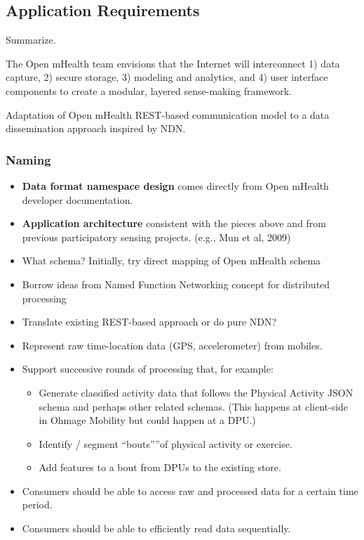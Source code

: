 \subsection{Application Requirements}

Summarize. 

The Open mHealth team envisions that the Internet will interconnect 1)
data capture, 2) secure storage, 3) modeling and analytics, and 4) user
interface components to create a modular, layered sense-making framework.  

Adaptation of Open mHealth REST-based communication model to a data dissemination approach inspired by NDN.

\subsubsection{Naming} 
\begin{itemize}
\item \textbf{Data format namespace design} comes directly from Open mHealth developer documentation. 
\item \textbf{Application architecture} consistent with the pieces above and from previous participatory sensing projects. (e.g., Mun et al, 2009)
\item What schema? Initially, try direct mapping of Open mHealth schema
\item Borrow ideas from Named Function Networking concept for distributed processing
\item Translate existing REST-based approach or do pure NDN? 
\item Represent raw time-location data (GPS, accelerometer) from mobiles. 
\item Support successive rounds of processing that, for example:  
    \begin{itemize}
    \item Generate classified activity data that follows the Physical Activity JSON schema and perhaps other related schemas.  (This happens at client-side in Ohmage Mobility but could happen at a DPU.)	
    \item Identify / segment ``bouts”''of physical activity or exercise. 
    \item Add features to a bout from DPUs to the existing store. 
    \end{itemize}
\item Consumers should be able to access raw and processed data for a certain time period.
\item Consumers should be able to efficiently read data sequentially. 
\end{itemize}

